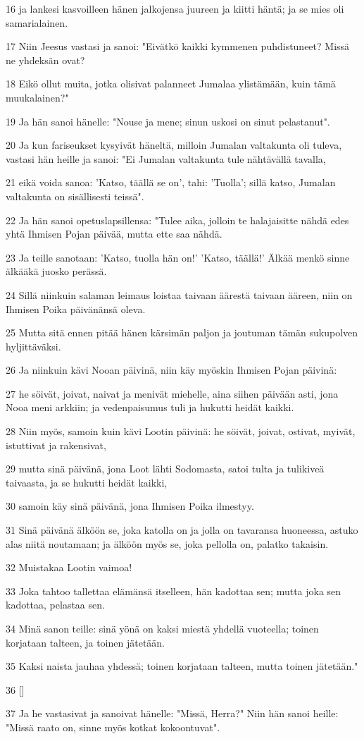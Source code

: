 \par 16 ja lankesi kasvoilleen hänen jalkojensa juureen ja kiitti häntä; ja se mies oli samarialainen.
\par 17 Niin Jeesus vastasi ja sanoi: "Eivätkö kaikki kymmenen puhdistuneet? Missä ne yhdeksän ovat?
\par 18 Eikö ollut muita, jotka olisivat palanneet Jumalaa ylistämään, kuin tämä muukalainen?"
\par 19 Ja hän sanoi hänelle: "Nouse ja mene; sinun uskosi on sinut pelastanut".
\par 20 Ja kun fariseukset kysyivät häneltä, milloin Jumalan valtakunta oli tuleva, vastasi hän heille ja sanoi: "Ei Jumalan valtakunta tule nähtävällä tavalla,
\par 21 eikä voida sanoa: 'Katso, täällä se on', tahi: 'Tuolla'; sillä katso, Jumalan valtakunta on sisällisesti teissä".
\par 22 Ja hän sanoi opetuslapsillensa: "Tulee aika, jolloin te halajaisitte nähdä edes yhtä Ihmisen Pojan päivää, mutta ette saa nähdä.
\par 23 Ja teille sanotaan: 'Katso, tuolla hän on!' 'Katso, täällä!' Älkää menkö sinne älkääkä juosko perässä.
\par 24 Sillä niinkuin salaman leimaus loistaa taivaan äärestä taivaan ääreen, niin on Ihmisen Poika päivänänsä oleva.
\par 25 Mutta sitä ennen pitää hänen kärsimän paljon ja joutuman tämän sukupolven hyljittäväksi.
\par 26 Ja niinkuin kävi Nooan päivinä, niin käy myöskin Ihmisen Pojan päivinä:
\par 27 he söivät, joivat, naivat ja menivät miehelle, aina siihen päivään asti, jona Nooa meni arkkiin; ja vedenpaisumus tuli ja hukutti heidät kaikki.
\par 28 Niin myös, samoin kuin kävi Lootin päivinä: he söivät, joivat, ostivat, myivät, istuttivat ja rakensivat,
\par 29 mutta sinä päivänä, jona Loot lähti Sodomasta, satoi tulta ja tulikiveä taivaasta, ja se hukutti heidät kaikki,
\par 30 samoin käy sinä päivänä, jona Ihmisen Poika ilmestyy.
\par 31 Sinä päivänä älköön se, joka katolla on ja jolla on tavaransa huoneessa, astuko alas niitä noutamaan; ja älköön myös se, joka pellolla on, palatko takaisin.
\par 32 Muistakaa Lootin vaimoa!
\par 33 Joka tahtoo tallettaa elämänsä itselleen, hän kadottaa sen; mutta joka sen kadottaa, pelastaa sen.
\par 34 Minä sanon teille: sinä yönä on kaksi miestä yhdellä vuoteella; toinen korjataan talteen, ja toinen jätetään.
\par 35 Kaksi naista jauhaa yhdessä; toinen korjataan talteen, mutta toinen jätetään."
\par 36 []
\par 37 Ja he vastasivat ja sanoivat hänelle: "Missä, Herra?" Niin hän sanoi heille: "Missä raato on, sinne myös kotkat kokoontuvat".

